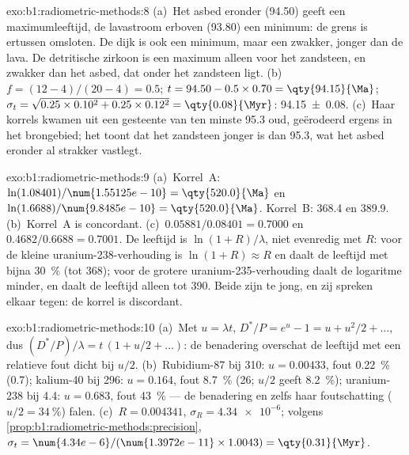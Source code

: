 \begin{solution}{exo:b1:radiometric-methods:8}
(a)~Het asbed eronder (\qty{94.50}{\Ma}) geeft een maximumleeftijd, de lavastroom erboven
(\qty{93.80}{\Ma}) een minimum: de grens is ertussen omsloten. De dijk is
ook een minimum, maar een zwakker, jonger dan de lava. De detritische zirkoon is een
maximum alleen voor het zandsteen, en zwakker dan het asbed, dat onder het
zandsteen ligt. (b)~$f = (12 - 4)/(20 - 4) = 0.5$; $t = 94.50 - 0.5 \times 0.70 =
\qty{94.15}{\Ma}$; $\sigma_t = \sqrt{0.25 \times 0.10^2 + 0.25 \times 0.12^2} =
\qty{0.08}{\Myr}$: \qty[uncertainty-mode=separate]{94.15(8)}{\Ma}. (c)~Haar
korrels kwamen uit een gesteente van ten minste \qty{95.3}{\Ma} oud, geërodeerd ergens in het
brongebied; het toont dat het zandsteen jonger is dan \qty{95.3}{\Ma}, wat het asbed eronder al strakker vastlegt.
\end{solution}

\begin{solution}{exo:b1:radiometric-methods:9}
(a)~Korrel~A: $\ln(1.08401)/\num{1.55125e-10} = \qty{520.0}{\Ma}$ en
$\ln(1.6688)/\num{9.8485e-10} = \qty{520.0}{\Ma}$. Korrel~B: \qty{368.4}{\Ma} en
\qty{389.9}{\Ma}. (b)~Korrel~A is concordant. (c)~$0.05881/0.08401 = 0.7000$ en
$0.4682/0.6688 = 0.7001$. De leeftijd is $\ln(1 + R)/\lambda$, niet evenredig met
$R$: voor de kleine uranium-238-verhouding is $\ln(1+R) \approx R$ en daalt de leeftijd met
bijna \qty{30}{\percent} (tot \qty{368}{\Ma}); voor de grotere uranium-235-verhouding
daalt de logaritme minder, en daalt de leeftijd alleen tot \qty{390}{\Ma}. Beide zijn te
jong, en zij spreken elkaar tegen: de korrel is discordant.
\end{solution}

\begin{solution}{exo:b1:radiometric-methods:10}
(a)~Met $u = \lambda t$, $D^*/P = e^u - 1 = u + u^2/2 + \dots$, dus $(D^*/P)/\lambda
= t\,(1 + u/2 + \dots)$: de benadering overschat de leeftijd met een relatieve fout dicht bij $u/2$. (b)~Rubidium-87 bij \qty{310}{\Ma}: $u = 0.00433$, fout
\qty{0.22}{\percent} (\qty{0.7}{\Myr}); kalium-40 bij \qty{296}{\Ma}: $u =
0.164$, fout \qty{8.7}{\percent} (\qty{26}{\Myr}; $u/2$ geeft \qty{8.2}{\percent});
uranium-238 bij \qty{4.4}{\Ga}: $u = 0.683$, fout \qty{43}{\percent} --- de
benadering en zelfs haar foutschatting ($u/2 = \qty{34}{\percent}$) falen.
(c)~$R = 0.004341$, $\sigma_R = \num{4.34e-6}$; volgens
\cref{prop:b1:radiometric-methods:precision}, $\sigma_t =
\num{4.34e-6}/(\num{1.3972e-11} \times 1.0043) = \qty{0.31}{\Myr}$.
\end{solution}

